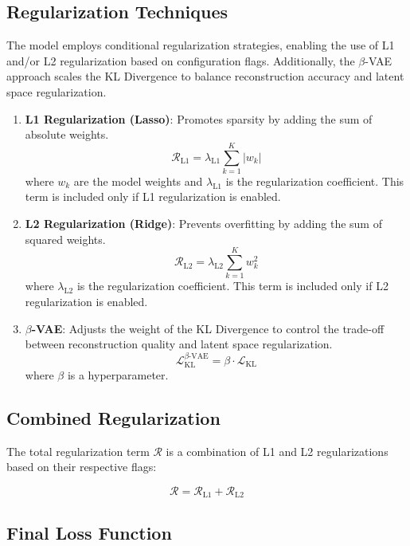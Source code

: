\documentclass[12pt]{article}
\begin{document}
\subsection{Regularization Techniques}

The model employs conditional regularization strategies, enabling the use of L1 and/or L2 regularization based on configuration flags. Additionally, the \(\beta\)-VAE approach scales the KL Divergence to balance reconstruction accuracy and latent space regularization.

\begin{enumerate}[label=\alph*.]
    \item \textbf{L1 Regularization (Lasso)}: Promotes sparsity by adding the sum of absolute weights.
    \[
    \mathcal{R}_{\text{L1}} = \lambda_{\text{L1}} \sum_{k=1}^{K} |w_k|
    \]
    where \( w_k \) are the model weights and \( \lambda_{\text{L1}} \) is the regularization coefficient. This term is included only if L1 regularization is enabled.

    \item \textbf{L2 Regularization (Ridge)}: Prevents overfitting by adding the sum of squared weights.
    \[
    \mathcal{R}_{\text{L2}} = \lambda_{\text{L2}} \sum_{k=1}^{K} w_k^2
    \]
    where \( \lambda_{\text{L2}} \) is the regularization coefficient. This term is included only if L2 regularization is enabled.

    \item \textbf{\(\beta\)-VAE}: Adjusts the weight of the KL Divergence to control the trade-off between reconstruction quality and latent space regularization.
    \[
    \mathcal{L}_{\text{KL}}^{\beta\text{-VAE}} = \beta \cdot \mathcal{L}_{\text{KL}}
    \]
    where \( \beta \) is a hyperparameter.

\end{enumerate}

\subsection{Combined Regularization}

The total regularization term \( \mathcal{R} \) is a combination of L1 and L2 regularizations based on their respective flags:

\[
\mathcal{R} = \mathcal{R}_{\text{L1}} + \mathcal{R}_{\text{L2}}
\]

\subsection{Final Loss Function}
\end{document}
